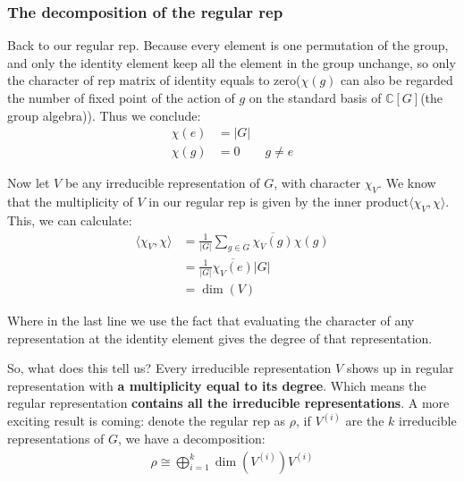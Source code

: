\documentclass[]{ctexart}
\begin{document}
		\subsubsection{The decomposition of the regular rep}
			Back to our regular rep. Because every element is one permutation of the group, and only the identity element keep all the element in the group unchange, so only the character of rep matrix of identity equals to zero($ \chi(g) $ can also be regarded the number of fixed point of the action of $ g $ on the standard basis of $ \mathbb{C}[G] $(the group algebra)). Thus we conclude:
				\begin{equation*}
				\begin{aligned}
					\chi(e)&=\lvert G\rvert\\
					\chi(g)&=0\qquad g\neq e
				\end{aligned}
				\end{equation*}
			
			Now let $ V $ be any irreducible representation of $ G $, with character $ \chi_V $. We know that the multiplicity of $ V $ in our regular rep is given by the inner product$  \langle\chi_V,\chi\rangle $. This, we can calculate:
				\begin{equation*}
				\begin{aligned}
					\langle \chi_V,\chi\rangle&=\frac{1}{\lvert G\rvert}\sum\limits_{g\in G}\overline{\chi_V(g)}\chi(g)\\
					&=\frac{1}{\lvert G\rvert}\overline{\chi_V(e)}\lvert G\rvert\\
					&=\dim(V)
				\end{aligned}
				\end{equation*}
			
			Where in the last line we use the fact that evaluating the character of any representation at the identity element gives the degree of that representation.
			
			So, what does this tell us? Every irreducible representation $ V $ shows up in regular representation with \textbf{a multiplicity equal to its degree}. Which means the regular representation \textbf{contains all the irreducible representations}. A more exciting result is coming: denote the regular rep as $\rho$, if $ V^{(i)} $ are the $ k $ irreducible representations of $ G $, we have a decomposition:
				\begin{equation*}
				\begin{aligned}
					\rho \cong\bigoplus\limits_{i=1}^k\dim\left(V^{(i)}\right)V^{(i)}
				\end{aligned}
				\end{equation*}
\end{document}
